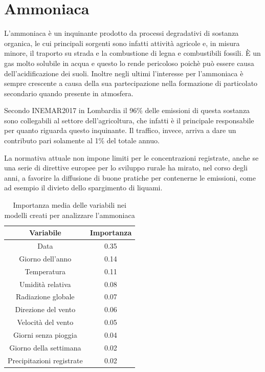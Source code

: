 \documentclass[a4paper]{report}
\begin{document}
\section{Ammoniaca}
L'ammoniaca è un inquinante prodotto da processi degradativi di sostanza organica, le cui principali sorgenti sono infatti attività agricole e, in misura minore, il traporto su strada e la combustione di legna e combustibili fossili. È un gas molto solubile in acqua e questo lo rende pericoloso poichè può essere causa dell'acidificazione dei suoli. Inoltre negli ultimi l'interesse per l'ammoniaca è sempre crescente a causa della sua partecipazione nella formazione di particolato secondario quando presente in atmosfera.

Secondo INEMAR2017 in Lombardia il 96\% delle emissioni di questa sostanza sono collegabili al settore dell'agricoltura, che infatti è il principale responsabile per quanto riguarda questo inquinante. Il traffico, invece, arriva a dare un contributo pari solamente al 1\% del totale annuo.

La normativa attuale non impone limiti per le concentrazioni registrate, anche se una serie di direttive europee per lo sviluppo rurale ha mirato, nel corso degli anni, a favorire la diffusione di buone pratiche per contenerne le emissioni, come ad esempio il divieto dello spargimento di liquami. 

\begin{table}[h!]
\centering
\begin{tabular}{ |c c| }
	\hline
	Variabile & Importanza \\
	\hline
	Data & 0.35 \\
	Giorno dell'anno & 0.14 \\
	Temperatura & 0.11 \\
	Umidità relativa & 0.08 \\
	Radiazione globale & 0.07 \\
	Direzione del vento & 0.06 \\
	Velocità del vento & 0.05 \\
	Giorni senza pioggia & 0.04 \\
	Giorno della settimana & 0.02 \\
	Precipitazioni registrate & 0.02 \\
	\hline
\end{tabular}
\caption{Importanza media delle variabili nei modelli creati per analizzare l'ammoniaca}
\label{table:importanza_ammoniaca}
\end{table}
\end{document}
